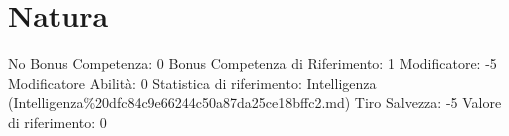 \section{Natura}\label{natura}

\begin{description}
\tightlist
\item[Tags: ABI]
No Bonus Competenza: 0 Bonus Competenza di Riferimento: 1 Modificatore:
-5 Modificatore Abilità: 0 Statistica di riferimento: Intelligenza
(Intelligenza\%20dfc84c9e66244c50a87da25ce18bffc2.md) Tiro Salvezza: -5
Valore di riferimento: 0
\end{description}
